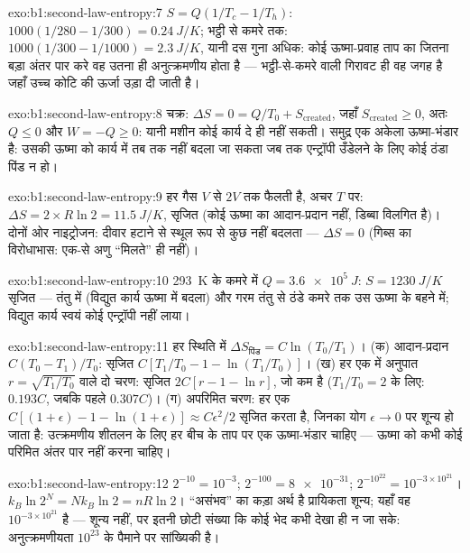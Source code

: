 \begin{solution}{exo:b1:second-law-entropy:7}
$S = Q(1/T_c - 1/T_h)$: $1000(1/280 - 1/300) = \qty{0.24}{J/K}$; भट्ठी से
कमरे तक: $1000(1/300 - 1/1000) = \qty{2.3}{J/K}$, यानी दस गुना अधिक: कोई
ऊष्मा-प्रवाह ताप का जितना बड़ा अंतर पार करे वह उतना ही अनुत्क्रमणीय होता है
--- भट्ठी-से-कमरे वाली गिरावट ही वह जगह है जहाँ उच्च कोटि की ऊर्जा उड़ा दी
जाती है।
\end{solution}

\begin{solution}{exo:b1:second-law-entropy:8}
चक्र: $\Delta S = 0 = Q/T_0 + S_{\mathrm{created}}$, जहाँ $S_{\mathrm{created}} \geq 0$,
अतः $Q \leq 0$ और $W = -Q \geq 0$: यानी मशीन कोई कार्य दे ही नहीं सकती।
समुद्र एक अकेला ऊष्मा-भंडार है: उसकी ऊष्मा को कार्य में तब तक नहीं बदला जा
सकता जब तक एन्ट्रॉपी उँडेलने के लिए कोई ठंडा पिंड न हो।
\end{solution}

\begin{solution}{exo:b1:second-law-entropy:9}
हर गैस $V$ से $2V$ तक फैलती है, अचर $T$ पर: $\Delta S = 2 \times R\ln2
= \qty{11.5}{J/K}$, सृजित (कोई ऊष्मा का आदान-प्रदान नहीं, डिब्बा विलगित
है)। दोनों ओर नाइट्रोजन: दीवार हटाने से स्थूल रूप से कुछ नहीं बदलता ---
$\Delta S = 0$ (गिब्स का विरोधाभास: एक-से अणु ``मिलते'' ही नहीं)।
\end{solution}

\begin{solution}{exo:b1:second-law-entropy:10}
\qty{293}{K} के कमरे में $Q = \qty{3.6e5}{J}$: $S = \qty{1230}{J/K}$
सृजित --- तंतु में (विद्युत कार्य ऊष्मा में बदला) और गरम तंतु से ठंडे कमरे
तक उस ऊष्मा के बहने में; विद्युत कार्य स्वयं कोई एन्ट्रॉपी नहीं लाया।
\end{solution}

\begin{solution}{exo:b1:second-law-entropy:11}
हर स्थिति में $\Delta S_{\text{पिंड}} = C\ln(T_0/T_1)$। (क) आदान-प्रदान
$C(T_0 - T_1)/T_0$: सृजित $C[T_1/T_0 - 1 - \ln(T_1/T_0)]$। (ख) हर एक में
अनुपात $r = \sqrt{T_1/T_0}$ वाले दो चरण: सृजित $2C[r - 1 - \ln r]$, जो कम है
($T_1/T_0 = 2$ के लिए: $0.193C$, जबकि पहले $0.307C$)। (ग) अपरिमित चरण:
हर एक $C[(1 + \epsilon) - 1 - \ln(1 + \epsilon)] \approx C\epsilon^2/2$ सृजित करता
है, जिनका योग $\epsilon \to 0$ पर शून्य हो जाता है: उत्क्रमणीय शीतलन के लिए
हर बीच के ताप पर एक ऊष्मा-भंडार चाहिए --- ऊष्मा को कभी कोई परिमित अंतर पार
नहीं करना चाहिए।
\end{solution}

\begin{solution}{exo:b1:second-law-entropy:12}
$2^{-10} = 10^{-3}$; $2^{-100} = \num{8e-31}$; $2^{-10^{22}} = 10^{-3\times10^{21}}$।
$k_B\ln2^N = Nk_B\ln2 = nR\ln2$। ``असंभव'' का कड़ा अर्थ है प्रायिकता
शून्य; यहाँ वह $10^{-3\times10^{21}}$ है --- शून्य नहीं, पर इतनी छोटी संख्या कि
कोई भेद कभी देखा ही न जा सके: अनुत्क्रमणीयता $10^{23}$ के पैमाने पर
सांख्यिकी है।
\end{solution}

